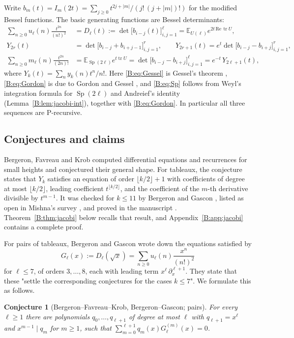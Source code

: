 \documentclass[11pt,a4paper]{article}
\newtheorem{conjecture}[theorem]{Conjecture}
\theoremstyle{definition}
\theoremstyle{remark}
\newcommand{\E}{\mathbb E}
\newcommand{\fl}[1]{\lfloor #1\rfloor}
\DeclareMathOperator{\tr}{tr}
\DeclareMathOperator{\Sp}{Sp}
\numberwithin{equation}{section}
\begin{document}
Write $b_m(t)=I_m(2t)=\sum_{j\ge0}t^{2j+|m|}/(j!\,(j+|m|)!)$ for the modified Bessel functions. The basic generating functions are Bessel determinants:
\begin{align}
\sum_{n\ge0}u_\ell(n)\frac{t^{2n}}{(n!)^2}&=D_\ell(t):=\det\bigl[b_{i-j}(t)\bigr]_{i,j=1}^{\ell}=\E_{U(\ell)}e^{2t\,\mathrm{Re}\,\tr U},\label{B:eq:Gessel}\\
Y_{2r}(t)&=\det\bigl[b_{i-j}+b_{i+j-1}\bigr]_{i,j=1}^{r},\qquad Y_{2r+1}(t)=e^{t}\det\bigl[b_{i-j}-b_{i+j}\bigr]_{i,j=1}^{r},\label{B:eq:Gordon}\\
\sum_{n\ge0}m_\ell(n)\frac{t^{2n}}{(2n)!}&=\E_{\Sp(2\ell)}e^{t\tr U}=\det\bigl[b_{i-j}-b_{i+j}\bigr]_{i,j=1}^{\ell}=e^{-t}\,Y_{2\ell+1}(t),\label{B:eq:Sp}
\end{align}
where $Y_k(t)=\sum_n y_k(n)t^n/n!$. Here \eqref{B:eq:Gessel} is Gessel's theorem \cite{Ges90}, \eqref{B:eq:Gordon} is due to Gordon and Gessel \cite{Ges90}, and \eqref{B:eq:Sp} follows from Weyl's integration formula for $\Sp(2\ell)$ and Andreief's identity (Lemma~\ref{B:lem:jacobi-int}), together with \eqref{B:eq:Gordon}. In particular all three sequences are P-recursive.

\subsection{Conjectures and claims}
Bergeron, Favreau and Krob \cite{BFK95} computed differential equations and recurrences for small heights and conjectured their general shape. For tableaux, the conjecture states that $Y_k$ satisfies an equation of order $\fl{k/2}+1$ with coefficients of degree at most $\fl{k/2}$, leading coefficient $t^{\fl{k/2}}$, and the coefficient of the $m$-th derivative divisible by $t^{m-1}$. It was checked for $k\le11$ by Bergeron and Gascon \cite{BG00}, listed as open in Mishna's survey \cite[Conj.~9]{Mis19}, and proved in the manuscript \cite{Kei26}. Theorem~\ref{B:thm:jacobi} below recalls that result, and Appendix~\ref{B:app:jacobi} contains a complete proof.

For pairs of tableaux, Bergeron and Gascon \cite{BG00} wrote down the equations satisfied by
\[
G_\ell(x):=D_\ell(\sqrt x)=\sum_{n\ge0}u_\ell(n)\frac{x^n}{(n!)^2}
\]
for $\ell\le7$, of orders $3,\dots,8$, each with leading term $x^\ell\,\partial_x^{\ell+1}$. They state that these "settle the corresponding conjectures for the cases $k\le7$". We formulate this as follows.

\begin{conjecture}[Bergeron--Favreau--Krob, Bergeron--Gascon; pairs]\label{B:conj:pairs}
For every $\ell\ge1$ there are polynomials $q_0,\dots,q_{\ell+1}$ of degree at most $\ell$ with $q_{\ell+1}=x^\ell$ and $x^{m-1}\mid q_m$ for $m\ge1$, such that $\sum_{m=0}^{\ell+1}q_m(x)G_\ell^{(m)}(x)=0$.
\end{conjecture}
\end{document}
